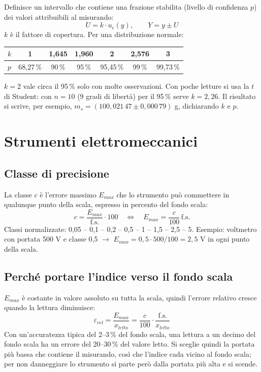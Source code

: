 \documentclass[11pt,a4paper]{article}
\begin{document}
Definisce un intervallo che contiene una frazione stabilita (livello di confidenza $p$) dei valori attribuibili al misurando:
\[
U = k \cdot u_c(y), \qquad Y = y \pm U
\]
$k$ è il fattore di copertura. Per una distribuzione normale:

\begin{center}
\begin{tabular}{l c c c c c c}
\toprule
$k$ & 1 & 1,645 & 1,960 & 2 & 2,576 & 3\\
\midrule
$p$ & 68,27\,\% & 90\,\% & 95\,\% & 95,45\,\% & 99\,\% & 99,73\,\%\\
\bottomrule
\end{tabular}
\end{center}

$k = 2$ vale circa il 95\,\% solo con molte osservazioni. Con poche letture si usa la $t$ di Student: con $n = 10$ (9 gradi di libertà) per il 95\,\% serve $k = 2{,}26$. Il risultato si scrive, per esempio, $m_s = (100{,}021\,47 \pm 0{,}000\,79)$ g, dichiarando $k$ e $p$.

\section*{Strumenti elettromeccanici}

\subsection*{Classe di precisione}

La classe $c$ è l'errore massimo $E_{max}$ che lo strumento può commettere in qualunque punto della scala, espresso in percento del fondo scala:
\[
c = \frac{E_{max}}{\mathrm{f.s.}} \cdot 100 \quad\Longleftrightarrow\quad E_{max} = \frac{c}{100}\,\mathrm{f.s.}
\]
Classi normalizzate: 0,05 -- 0,1 -- 0,2 -- 0,5 -- 1 -- 1,5 -- 2,5 -- 5. Esempio: voltmetro con portata 500 V e classe 0,5 $\rightarrow$ $E_{max} = 0{,}5\cdot500/100 = 2{,}5$ V in ogni punto della scala.

\subsection*{Perché portare l'indice verso il fondo scala}

$E_{max}$ è costante in valore assoluto su tutta la scala, quindi l'errore relativo cresce quando la lettura diminuisce:
\[
\varepsilon_{rel} = \frac{E_{max}}{x_{letto}} = \frac{c}{100}\cdot\frac{\mathrm{f.s.}}{x_{letto}}
\]
Con un'accuratezza tipica del 2--3\,\% del fondo scala, una lettura a un decimo del fondo scala ha un errore del 20--30\,\% del valore letto. Si sceglie quindi la portata più bassa che contiene il misurando, così che l'indice cada vicino al fondo scala; per non danneggiare lo strumento si parte però dalla portata più alta e si scende.
\end{document}
